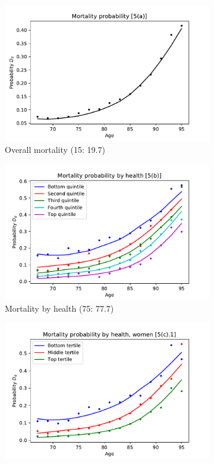 \documentclass[12pt,pdftex,letterpaper]{article}
\begin{document}
\begin{figure}[h!]
    \centering
    \begin{subfigure}[b]{0.49\textwidth}
        \centering
        \includegraphics[width=\textwidth]{../Figures/MortByAge.pdf}
        \caption{Overall mortality (15: 19.7)}
    \end{subfigure}
    \begin{subfigure}[b]{0.49\textwidth}
        \centering
        \includegraphics[width=\textwidth]{../Figures/MortByHealthAge.pdf}
        \caption{Mortality by health (75: 77.7)}
    \end{subfigure}
\begin{subfigure}[b]{0.49\textwidth}
        \centering
        \includegraphics[width=\textwidth]{../Figures/MortByHealthAgeWomen.pdf}

\end{subfigure}
\end{figure}
\end{document}
